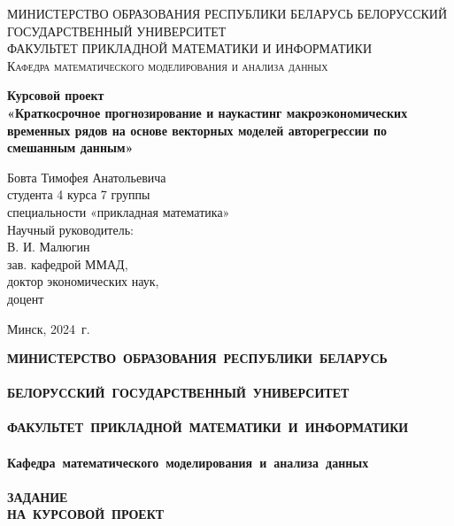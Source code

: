 \documentclass[a4paper, 14pt]{extreport}
\numberwithin{equation}{subsection}
\renewcommand{\contentsname}%
	{\centering \large ОГЛАВЛЕНИЕ}%
\numberwithin{equation}{section}
\begin{document}
	\def\contentsname{ОГЛАВЛЕНИЕ}
	
	\begin{titlepage}
		\begin{center}
			\textsc{МИНИСТЕРСТВО ОБРАЗОВАНИЯ РЕСПУБЛИКИ БЕЛАРУСЬ БЕЛОРУССКИЙ ГОСУДАРСТВЕННЫЙ УНИВЕРСИТЕТ
				\\[5mm]
				ФАКУЛЬТЕТ ПРИКЛАДНОЙ МАТЕМАТИКИ И ИНФОРМАТИКИ\\[2mm]
				Кафедра математического моделирования и анализа данных
			}
			
			\vfill
			
			\textbf{Курсовой проект
				\\[3mm]
				«Краткосрочное прогнозирование и наукастинг макроэкономических временных рядов на основе векторных моделей авторегрессии по смешанным данным»
				\\[26mm]
			}
		\end{center}
		
		\hfill
		\begin{minipage}{.5\textwidth}
			\begin{flushright}
				Бовта Тимофея Анатольевича\\
				студента 4 курса 7 группы\\
				специальности «прикладная математика»\\[5mm]
				
				Научный руководитель:\\[2mm] 
				В. И. Малюгин\\
				зав. кафедрой ММАД,\\
				доктор экономических наук,\\
				доцент
			\end{flushright}
		\end{minipage}%
		\vfill
		\begin{center}
			Минск, 2024\ г.
		\end{center}
	\end{titlepage}
	\newpage
	\setcounter{page}{2}
	\begin{center}
		\bf
		{
			\small\mbox{МИНИСТЕРСТВО~ОБРАЗОВАНИЯ~РЕСПУБЛИКИ~БЕЛАРУСЬ} \\~\\
			\mbox{БЕЛОРУССКИЙ~ГОСУДАРСТВЕННЫЙ~УНИВЕРСИТЕТ} \\~\\
			\mbox{ФАКУЛЬТЕТ~ПРИКЛАДНОЙ МАТЕМАТИКИ~И~ИНФОРМАТИКИ} \\~\\
			\mbox{Кафедра~математического~моделирования~и~анализа~данных} \\~\\[2mm]
		}
		\bf
		{
			\mbox{\small ЗАДАНИЕ}\\
			\mbox{\small НА КУРСОВОЙ ПРОЕКТ} \\[6mm]
		}
	\end{center}
\end{document}

